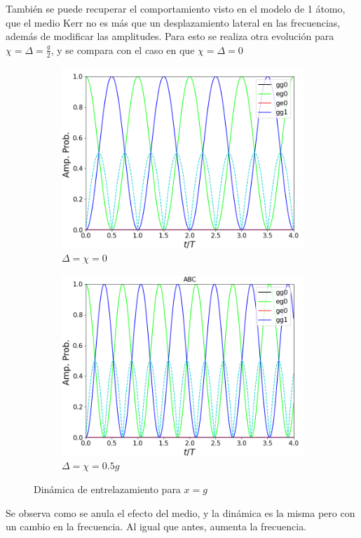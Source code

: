 También se puede recuperar el comportamiento visto en el modelo de 1 átomo, que el medio Kerr no es más que un desplazamiento lateral en las frecuencias, además de modificar las amplitudes. Para esto se realiza otra evolución para $\chi=\Delta=\frac{g}{2}$, y se compara con el caso en que $\chi=\Delta=0$
\begin{figure}[h]
    \centering
    \begin{subfigure}{0.49\textwidth}
        \includegraphics[width=\textwidth]{figuras/ch4/d=x=0 eg0 abc.png}
        \caption{$\Delta=\chi=0$}
        \label{fig4:comparacion kerr pob 1}
    \end{subfigure}
    \hfill
    \begin{subfigure}{0.49\textwidth}
        \includegraphics[width=\textwidth]{figuras/ch4/d=x=0.5 eg0 abc.png}
        \caption{$\Delta=\chi=0.5g$}
        \label{fig4:comparacion ker pob 2}
    \end{subfigure}
    \caption{Dinámica de entrelazamiento para $x=g$}
    \label{fig4:comparacion d vs x}
\end{figure}
Se observa como se anula el efecto del medio, y la dinámica es la misma pero con un cambio en la frecuencia. Al igual que antes, aumenta la frecuencia.

